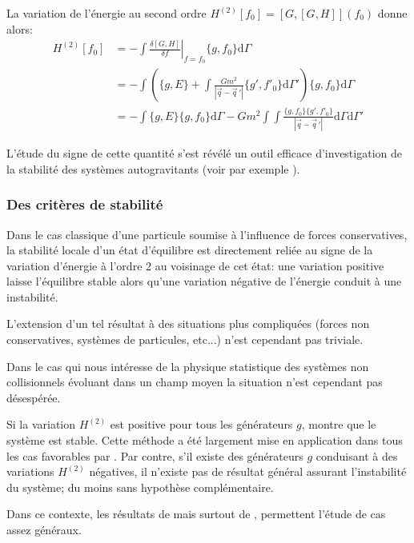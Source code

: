 La variation de l'énergie au second ordre
$
	H^{(2)} [f_{0}] = \left[G, [G,H] \right](f_0)
$
donne alors:
\begin{align}
	H^{(2)}[f_{0}]
	& = - \int \left.\frac{\delta [G,H]}{\delta f}\right|_{f=f_{0}} \{g,f_{0}\} \mathrm{d} \Gamma
	\nonumber \\
	& = - \int \left(
		\{g,E\} + \int \frac{Gm^2}{|\vec{q}-\vec{q}\,'|}
		\{g',f'_{0}\} \mathrm{d} \Gamma'
	\right) \{g,f_{0}\} \mathrm{d} \Gamma
	\nonumber \\
	& = - \int \{g,E\} \{g,f_{0}\} \mathrm{d} \Gamma
	- G m^2 \int\!\!\!\int \frac{\{g,f_{0}\}\{g',f'_{0}\}}{|\vec{q} - \vec{q}\,'|}
	\mathrm{d} \Gamma \mathrm{d} \Gamma'
\end{align}

L'étude du signe de cette quantité s'est révélé un outil efficace d'investigation de la stabilité des systèmes autogravitants (voir par exemple
\citet{JPerez96}).


\subsubsection{Des critères de stabilité}

Dans le cas classique d'une particule soumise à l'influence de forces conservatives, la stabilité locale d'un état d'équilibre est directement reliée
au signe de la variation d'énergie à l'ordre 2 au voisinage de cet état: une variation positive laisse l'équilibre stable alors qu'une variation
négative de l'énergie conduit à une instabilité.

L'extension d'un tel résultat à des situations plus compliquées (forces non conservatives, systèmes de particules, etc...) n'est cependant pas
triviale.

Dans le cas qui nous intéresse de la physique statistique des systèmes non collisionnels évoluant dans un champ moyen la situation n'est cependant pas
désespérée.

Si la variation $H^{(2)}$ est positive pour tous les générateurs $g$, \cite{bartho} montre que le système est stable. Cette méthode a été
largement mise en application dans tous les cas favorables par \cite{perezaly}. Par contre, s'il existe des générateurs $g$
conduisant à des variations $H^{(2)}$ négatives, il n'existe pas de résultat général assurant l'instabilité du système; du moins sans hypothèse
complémentaire.


Dans ce contexte, les résultats de \cite{blochmarsden} mais surtout de \cite{krechet}, permettent l'étude de cas assez généraux.

